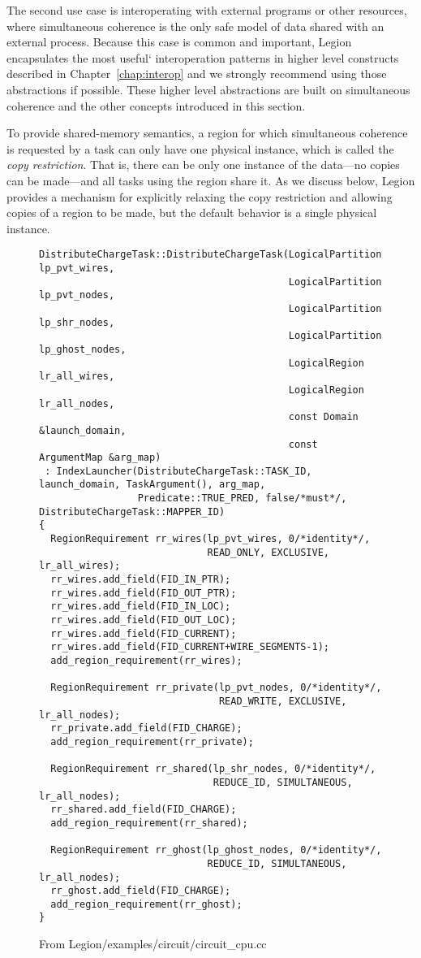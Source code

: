 The second use case is interoperating with external programs or other resources, where simultaneous coherence is the only safe model of data shared with an external process.
Because this case is common and important, Legion encapsulates the most useful` interoperation patterns in higher level constructs described in Chapter~\ref{chap:interop} and we strongly
recommend using those abstractions if possible.
These higher level abstractions are built on simultaneous coherence and the other concepts introduced in this section.

To provide shared-memory semantics, a region for which simultaneous
coherence is requested by a task can only have one physical instance,
which is called the {\em copy restriction}.  That is, there can be only
one instance of the data---no copies can be made---and all tasks using the
region share it.  As we discuss below, Legion provides a mechanism for
explicitly relaxing the copy restriction and allowing copies of a
region to be made, but the default behavior is a single physical
instance.

\begin{figure}
  {\small
\begin{lstlisting}
DistributeChargeTask::DistributeChargeTask(LogicalPartition lp_pvt_wires,
                                           LogicalPartition lp_pvt_nodes,
                                           LogicalPartition lp_shr_nodes,
                                           LogicalPartition lp_ghost_nodes,
                                           LogicalRegion lr_all_wires,
                                           LogicalRegion lr_all_nodes,
                                           const Domain &launch_domain,
                                           const ArgumentMap &arg_map)
 : IndexLauncher(DistributeChargeTask::TASK_ID, launch_domain, TaskArgument(), arg_map,
                 Predicate::TRUE_PRED, false/*must*/, DistributeChargeTask::MAPPER_ID)
{
  RegionRequirement rr_wires(lp_pvt_wires, 0/*identity*/,
                             READ_ONLY, EXCLUSIVE, lr_all_wires);
  rr_wires.add_field(FID_IN_PTR);
  rr_wires.add_field(FID_OUT_PTR);
  rr_wires.add_field(FID_IN_LOC);
  rr_wires.add_field(FID_OUT_LOC);
  rr_wires.add_field(FID_CURRENT);
  rr_wires.add_field(FID_CURRENT+WIRE_SEGMENTS-1);
  add_region_requirement(rr_wires);

  RegionRequirement rr_private(lp_pvt_nodes, 0/*identity*/,
                               READ_WRITE, EXCLUSIVE, lr_all_nodes);
  rr_private.add_field(FID_CHARGE);
  add_region_requirement(rr_private);

  RegionRequirement rr_shared(lp_shr_nodes, 0/*identity*/,
                              REDUCE_ID, SIMULTANEOUS, lr_all_nodes);
  rr_shared.add_field(FID_CHARGE);
  add_region_requirement(rr_shared);

  RegionRequirement rr_ghost(lp_ghost_nodes, 0/*identity*/,
                             REDUCE_ID, SIMULTANEOUS, lr_all_nodes);
  rr_ghost.add_field(FID_CHARGE);
  add_region_requirement(rr_ghost);
}
\end{lstlisting}
  }
  \caption{From Legion/examples/circuit/circuit\_cpu.cc}
  \label{fig:simul}
\end{figure}


